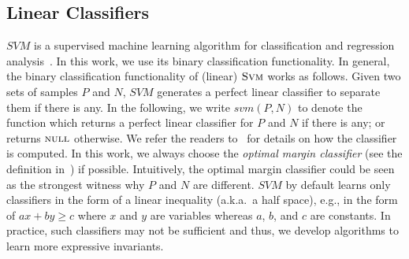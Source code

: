 \subsection{Linear Classifiers}
$\mathit{SVM}$ is a supervised machine learning algorithm for classification and regression analysis~\cite{svm:original}. 
In this work, we use its binary classification functionality.
In general, the binary classification functionality of (linear) $\textsc{Svm}$ works as follows.
Given two sets of samples $P$ and $N$, $\mathit{SVM}$ generates a perfect linear classifier to separate them if there is any.
In the following, we write $\mathit{svm}(P, N)$ to denote the function which returns a perfect linear classifier for $P$ and $N$ if there is any; 
or returns $\textsc{null}$ otherwise.
We refer the readers to~\cite{svm:smo} for details on how the classifier is computed.
In this work, we always choose the \textit{optimal margin classifier} (see the definition in~\cite{sharma2012interpolants}) if possible.
Intuitively, the optimal margin classifier could be seen as the strongest witness why $P$ and $N$ are different.
$\mathit{SVM}$ by default learns only classifiers in the form of a linear inequality (a.k.a.~a half space),
e.g., in the form of $\mathit{a x + b y \geq c}$ where $x$ and $y$ are variables whereas $a$, $b$, and $c$ are constants.
In practice, such classifiers may not be sufficient and thus, we develop algorithms to learn more expressive invariants.

